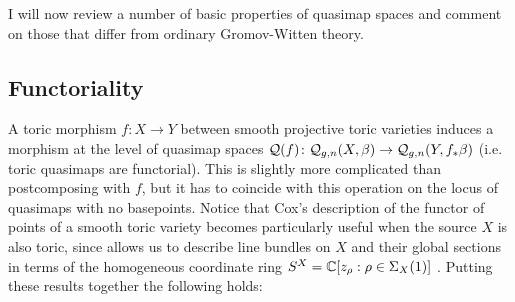 \smallskip

I will now review a number of basic properties of quasimap spaces and comment on those that differ from ordinary Gromov-Witten theory.

\subsection{Functoriality}\label{sec:functoriality} A toric morphism $f\colon X\to Y$ between smooth projective toric varieties induces a morphism at the level of quasimap spaces $\mathcal{Q}(f)\colon \mathcal{Q}_{g,n}(X,\beta)\rightarrow\mathcal{Q}_{g,n}(Y,f_*\beta)$ (i.e. toric quasimaps are functorial). This is slightly more complicated than postcomposing with $f$, but it has to coincide with this operation on the locus of quasimaps with no basepoints. Notice that Cox's description of the functor of points of a smooth toric variety becomes particularly useful when the source $X$ is also toric, since \cite{CoxRing} allows us to describe line bundles on $X$ and their global sections in terms of the homogeneous coordinate ring $S^X = \mathbb{C}[z_\rho : \rho \in \Sigma_X(1)]$ . Putting these results together the following holds:

